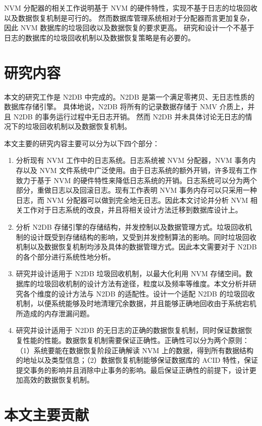 NVM 分配器的相关工作说明基于 NVM 的硬件特性，实现不基于日志的垃圾回收以及数据恢复机制是可行的。
然而数据库管理系统相对于分配器而言更加复杂，因此 NVM 数据库的垃圾回收以及数据恢复的要求更高。
研究和设计一个不基于日志的数据库的垃圾回收机制以及数据恢复策略是有必要的。

\section{研究内容}

本文的研究工作是 N2DB 中完成的。N2DB 是第一个满足零拷贝、无日志性质的数据库存储引擎。
具体地说，N2DB 将所有的记录数据存储于 NMV 介质上，并且 N2DB 的事务运行过程中无日志开销。
然而 N2DB 并未具体讨论无日志的情况下的垃圾回收机制以及数据恢复机制。

本文主要的研究内容主要可以分为以下四个部分：
\begin{enumerate}
    \item 分析现有 NVM 工作中的日志系统。日志系统被 NVM 分配器，NVM 事务内存以及 NVM 文件系统中广泛使用。由于日志系统的额外开销，许多现有工作致力于基于 NVM 的硬件特性来降低日志系统的开销。日志系统可以分为两个部分，重做日志以及回滚日志。现有工作表明 NVM 事务内存可以只采用一种日志，而 NVM 分配器可以做到完全地无日志。因此本文讨论并分析 NVM 相关工作对于日志系统的改良，并且将相关设计方法迁移到数据库设计上。
    \item 分析 N2DB 存储引擎的存储结构，并发控制以及数据管理方式。垃圾回收机制的设计既受到存储结构的影响，又受到并发控制算法的影响。同时垃圾回收机制以及数据恢复机制均涉及具体的数据管理方式。因此本文需要对于 N2DB 的各个部分进行系统性地分析。
    \item 研究并设计适用于 N2DB 垃圾回收机制，以最大化利用 NVM 存储空间。数据库的垃圾回收机制的设计方法有途径，粒度以及频率等维度。本文分析并研究各个维度的设计方法与 N2DB 的适配性。设计一个适配 N2DB 的垃圾回收机制，以便系统能够及时地清理冗余数据，并且能够正确地回收由于系统宕机所造成的内存泄漏问题。
    \item 研究并设计适用于 N2DB 的无日志的正确的数据恢复机制，同时保证数据恢复性能的性能。数据恢复机制需要保证正确性。正确性可以分为两个原则：（1）系统要能在数据恢复阶段正确解读 NVM 上的数据，得到所有数据结构的地址以及类型信息；（2）数据恢复机制能够保证数据库的 ACID 特性，保证提交事务的影响并且消除中止事务的影响。最后保证正确性的前提下，设计更加高效的数据恢复机制。
\end{enumerate}

\section{本文主要贡献}

